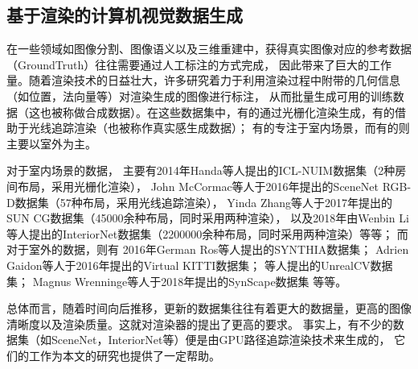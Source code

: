 \subsection{基于渲染的计算机视觉数据生成}

在一些领域如图像分割、图像语义以及三维重建中，获得真实图像对应的参考数据（GroundTruth）往往需要通过人工标注的方式完成，
因此带来了巨大的工作量。随着渲染技术的日益壮大，许多研究着力于利用渲染过程中附带的几何信息（如位置，法向量等）对渲染生成的图像进行标注，
从而批量生成可用的训练数据（这也被称做合成数据）。在这些数据集中，有的通过光栅化渲染生成，有的借助于光线追踪渲染（也被称作真实感生成数据）；
有的专注于室内场景，而有的则主要以室外为主。

对于室内场景的数据，
主要有2014年Handa等人提出的ICL-NUIM数据集\cite{handa:etal:ICRA2014}（2种房间布局，采用光栅化渲染），
John McCormac等人于2016年提出的SceneNet RGB-D数据集\cite{McCormac:etal:arXiv2016}（57种布局，采用光线追踪渲染），
Yinda Zhang等人于2017年提出的SUN CG数据集\cite{song2016ssc}（45000余种布局，同时采用两种渲染），
以及2018年由Wenbin Li等人提出的InteriorNet数据集\cite{InteriorNet18}（2200000余种布局，同时采用两种渲染）等等；
而对于室外的数据，则有
2016年German Ros等人提出的SYNTHIA数据集\cite{7780721}；
Adrien Gaidon等人于2016年提出的Virtual KITTI数据集\cite{Gaidon2016VirtualWorldsAP}；
等人提出的UnrealCV数据集\cite{Qiu2016UnrealCVCC}；
Magnus Wrenninge等人于2018年提出的SynScape数据集\cite{Wrenninge2018SynscapesAP}
等等。

总体而言，随着时间向后推移，更新的数据集往往有着更大的数据量，更高的图像清晰度以及渲染质量。这就对渲染器的提出了更高的要求。
事实上，有不少的数据集（如SceneNet，InteriorNet等）便是由GPU路径追踪渲染技术来生成的，
它们的工作为本文的研究也提供了一定帮助。